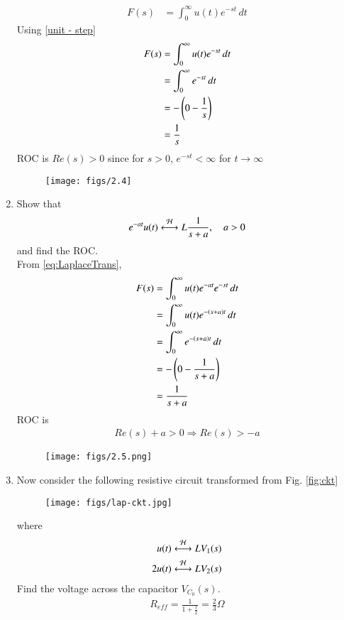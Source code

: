 \documentclass[journal,12pt,twocolumn]{IEEEtran}
\renewcommand\thesection{\arabic{section}}
\begin{document}
\begin{enumerate}[label=\arabic*.,ref=\thesection.\theenumi]
\begin{align}
F(s)&=\int_{0}^{\infty} u(t)e^{-st} \,dt
\end{align}
Using \eqref{unit - step}
\begin{align}
F(s)&=\int_{0}^{\infty} u(t)e^{-st} \,dt\\
&=\int_{0}^{\infty} e^{-st} \,dt\\
&=-\left(0-\frac{1}{s}\right)\\
&=\frac{1}{s}
\end{align}
ROC is $ Re(s)>0$ since for $s>0$, $e^{-st}<\infty$ for $t \to \infty$
\begin{figure}[!ht]
\centering
\texttt{[image: figs/2.4]}
\caption{}
\label{fig:roc1}
\end{figure}
\item Show that 
\begin{align}
e^{-at}u(t) \overset{\mathcal{H}}{ \longleftrightarrow}{L} \frac{1}{s+a}, \quad a > 0
\end{align}
and find the ROC.\\
\solution From \ref{eq:LaplaceTrans},
\begin{align}
F(s)&=\int_{0}^{\infty} u(t)e^{-at}e^{-st} \,dt\\
&=\int_{0}^{\infty} u(t)e^{-\left(s+a\right)t} \,dt\\
&=\int_{0}^{\infty} e^{-\left(s+a\right)t} \,dt\\
&=-\left(0-\frac{1}{s+a}\right)\\
&=\frac{1}{s+a}
\end{align}
ROC is
\begin{align}
Re(s)+a>0 \Rightarrow  Re(s)>-a
\end{align}
\begin{figure}[!ht]
\centering
\texttt{[image: figs/2.5.png]}
\caption{}
\label{fig:roc2}
\end{figure}
\item Now consider the following resistive circuit transformed from 
Fig. \ref{fig:ckt}
\begin{figure}[!ht]
\centering
\texttt{[image: figs/lap-ckt.jpg]}
\caption{}
\label{fig:lap-ckt}
\end{figure}
where 
\begin{align}
u(t) \overset{\mathcal{H}}{ \longleftrightarrow}{L} V_1(s)\\
2u(t) \overset{\mathcal{H}}{ \longleftrightarrow}{L} V_2(s)
\end{align}
Find the voltage across the capacitor $V_{C_0}(s)$.\\
\solution
\begin{align}
R_{eff}=\frac{1}{1+\frac{1}{2}} = \frac{2}{3} \Omega\\

\end{align}
\end{enumerate}
\end{document}
